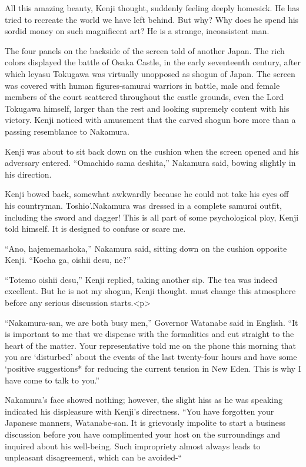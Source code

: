 \documentclass[]{article}
\begin{document}
{All this amazing beauty, Kenji thought, suddenly feeling deeply homesick. He has tried to recreate the world we have left behind. But why? Why does he spend his sordid money on such magnificent art? He is a strange, inconsistent man.

The four panels on the backside of the screen told of another Japan. The rich colors displayed the battle of Osaka Castle, in the early seventeenth century, after which leyasu Tokugawa was virtually unopposed as shogun of Japan. The screen was covered with human figures-samurai warriors in battle, male and female members of the court scattered throughout the castle grounds, even the Lord Tokugawa himself, larger than the rest and looking supremely content with his victory. Kenji noticed with amusement that the carved shogun bore more than a passing resemblance to Nakamura.

Kenji was about to sit back down on the cushion when the screen opened and his adversary entered. “Omachido sama deshita,” Nakamura said, bowing slightly in his direction.

Kenji bowed back, somewhat awkwardly because he could not take his eyes off his countryman. Toshio’.Nakamura was dressed in a complete samurai outfit, including the sword and dagger! This is all part of some psychological ploy, Kenji told himself. It is designed to confuse or scare me.

“Ano, hajememashoka,” Nakamura said, sitting down on the cushion opposite Kenji. “Kocha ga, oishii desu, ne?”

“Totemo oishii desu,” Kenji replied, taking another sip. The tea was indeed excellent. But he is not my shogun, Kenji thought. must change this atmosphere before any serious discussion starts.<p>

“Nakamura-san, we are both busy men,” Governor Watanabe said in English. “It is important to me that we dispense with the formalities and cut straight to the heart of the matter. Your representative told me on the phone this morning that you are ‘disturbed’ about the events of the last twenty-four hours and have some ‘positive suggestions* for reducing the current tension in New Eden. This is why I have come to talk to you.”

Nakamura’s face showed nothing; however, the slight hiss as he was speaking indicated his displeasure with Kenji’s directness. “You have forgotten your Japanese manners, Watanabe-san. It is grievously impolite to start a business discussion before you have complimented your host on the surroundings and inquired about his well-being. Such impropriety almost always leads to unpleasant disagreement, which can be avoided-“

}
\end{document}
